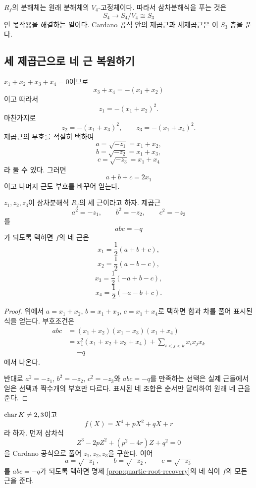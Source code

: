 $R_f$의 분해체는 원래 분해체의 $V_4$-고정체이다. 따라서 삼차분해식을 푸는 것은
\[
  S_4\longrightarrow S_4/V_4\cong S_3
\]
인 몫작용을 해결하는 일이다. Cardano 공식 안의 제곱근과 세제곱근은 이 $S_3$ 층을 푼다.

\subsection{세 제곱근으로 네 근 복원하기}

$x_1+x_2+x_3+x_4=0$이므로
\[
  x_3+x_4=-(x_1+x_2)
\]
이고 따라서
\[
  z_1=-(x_1+x_2)^2.
\]
마찬가지로
\[
  z_2=-(x_1+x_3)^2,
  \qquad
  z_3=-(x_1+x_4)^2.
\]
제곱근의 부호를 적절히 택하여
\[
  a=\sqrt{-z_1}=x_1+x_2,
\]
\[
  b=\sqrt{-z_2}=x_1+x_3,
\]
\[
  c=\sqrt{-z_3}=x_1+x_4
\]
라 둘 수 있다. 그러면
\[
  a+b+c=2x_1
\]
이고 나머지 근도 부호를 바꾸어 얻는다.

\begin{proposition}[사차근의 복원]
\label{prop:quartic-root-recovery}
$z_1,z_2,z_3$이 삼차분해식 $R_f$의 세 근이라고 하자. 제곱근
\[
  a^2=-z_1,
  \qquad b^2=-z_2,
  \qquad c^2=-z_3
\]
를
\[
  abc=-q
\]
가 되도록 택하면 $f$의 네 근은
\[
  \boxed{x_1=\frac12(a+b+c)},
\]
\[
  \boxed{x_2=\frac12(a-b-c)},
\]
\[
  \boxed{x_3=\frac12(-a+b-c)},
\]
\[
  \boxed{x_4=\frac12(-a-b+c)}.
\]
\end{proposition}

\begin{proof}
위에서 $a=x_1+x_2$, $b=x_1+x_3$, $c=x_1+x_4$로 택하면 합과 차를 풀어 표시된 식을 얻는다. 부호조건은
\[
\begin{aligned}
abc
&=(x_1+x_2)(x_1+x_3)(x_1+x_4)\\
&=x_1^2(x_1+x_2+x_3+x_4)
 +\sum_{i<j<k}x_ix_jx_k\\
&=-q
\end{aligned}
\]
에서 나온다.

반대로 $a^2=-z_1$, $b^2=-z_2$, $c^2=-z_3$와 $abc=-q$를 만족하는 선택은 실제 근들에서 얻은 선택과 짝수개의 부호만 다르다. 표시된 네 조합은 순서만 달리하여 원래 네 근을 준다.
\end{proof}

\begin{theorem}
\label{thm:quartic-radical-formula}
$\operatorname{char} K\ne2,3$이고
\[
  f(X)=X^4+pX^2+qX+r
\]
라 하자. 먼저 삼차식
\[
  Z^3-2pZ^2+(p^2-4r)Z+q^2=0
\]
을 Cardano 공식으로 풀어 $z_1,z_2,z_3$을 구한다. 이어
\[
  a=\sqrt{-z_1},\qquad
  b=\sqrt{-z_2},\qquad
  c=\sqrt{-z_3}
\]
를 $abc=-q$가 되도록 택하면 명제 \ref{prop:quartic-root-recovery}의 네 식이 $f$의 모든 근을 준다.
\end{theorem}

